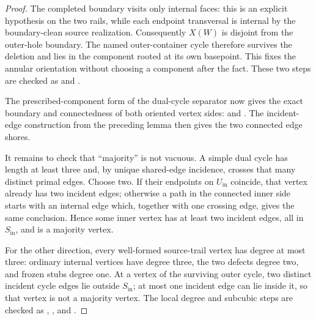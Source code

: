 \begin{proof}
The completed boundary visits only internal faces: this is an explicit
hypothesis on the two rails, while each endpoint transversal is internal by
the boundary-clean source realization.  Consequently \(X(W)\) is disjoint
from the outer-hole boundary.  The named outer-container cycle therefore
survives the deletion and lies in the component rooted at its own basepoint.
This fixes the annular orientation without choosing a component after the
fact.  These two steps are checked as
and
.

The prescribed-component form of the dual-cycle separator now gives the
exact boundary and connectedness of both oriented vertex sides:
and
.
The incident-edge construction from the preceding lemma then gives the two
connected edge shores.

It remains to check that ``majority'' is not vacuous.  A simple dual cycle has
length at least three and, by unique shared-edge incidence, crosses that many
distinct primal edges.  Choose two.  If their endpoints on
\(U_{\mathrm{in}}\) coincide, that vertex already has two incident edges;
otherwise a path in the connected inner side starts with an internal edge
which, together with one crossing edge, gives the same conclusion.  Hence
some inner vertex has at least two incident edges, all in
\(S_{\mathrm{in}}\), and is a majority vertex.

For the other direction, every well-formed source-trail vertex has degree at
most three: ordinary internal vertices have degree three, the two defects
degree two, and frozen stubs degree one.  At a vertex of the surviving outer
cycle, two distinct incident cycle edges lie outside
\(S_{\mathrm{in}}\); at most one incident edge can lie inside it, so that
vertex is not a majority vertex.  The local degree and subcubic steps are
checked as
,
,
and
.
\end{proof}

